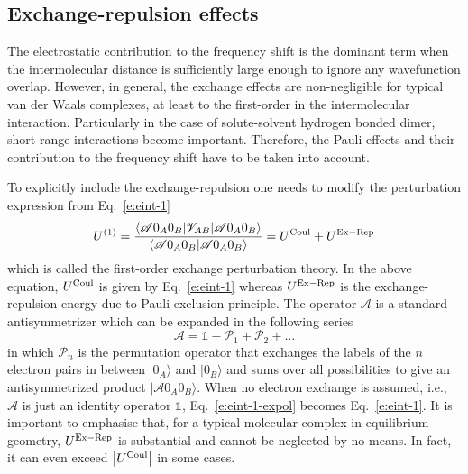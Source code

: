 \documentclass[a4paper,titlepage,twoside,fleqn,12pt]{book}
\begin{document}
\begin{refsection}
\subsection{Exchange-repulsion effects\label{s:dw-exrep}}

The electrostatic contribution to the frequency shift is the dominant term 
when the intermolecular distance is sufficiently large enough to ignore 
any wavefunction overlap. However, in general, the exchange effects
are non\hyp{}negligible for typical van der Waals complexes, at least to the first\hyp{}order
in the intermolecular interaction. Particularly 
in the case of solute\hyp{}solvent hydrogen bonded dimer, 
short\hyp{}range interactions become important. 
Therefore, the Pauli effects and their contribution to the frequency shift have to be taken into account.

To explicitly include the exchange\hyp{}repulsion one needs to
modify the perturbation expression from Eq.~\eqref{e:eint-1}
%
\begin{equation} \label{e:eint-1-expol}
U^{(1)} = 
\frac{
\langle \mathscr{A} 0_A0_B \lvert \mathscr{V}_{AB} \rvert \mathscr{A} 0_A0_B \rangle 
}{
\langle \mathscr{A} 0_A0_B \vert \mathscr{A} 0_A0_B \rangle 
}
= U^{\rm Coul} + U^{\rm Ex-Rep}
\end{equation}
%
which is called the first\hyp{}order exchange perturbation theory.
In the above equation, $U^{\rm Coul}$ is given by Eq.~\eqref{e:eint-1}
whereas $U^{\rm Ex-Rep}$ is the exchange\hyp{}repulsion
energy due to Pauli exclusion principle.
The operator $\mathscr{A}$ is a standard antisymmetrizer which
can be expanded in the following series
%
\begin{equation} \label{e:antisymmetrizer-series}
 \mathscr{A} = \mathbb{1} - \mathscr{P}_1 + \mathscr{P}_2 + \ldots
\end{equation}
%
in which $\mathscr{P}_n$ is the permutation operator that exchanges the labels 
of the $n$ electron pairs in between $\vert 0_A \rangle$ and $\vert 0_B \rangle$
and sums over all possibilities to give an antisymmetrized product
$\vert \mathscr{A} 0_A0_B \rangle $. When no electron exchange is
assumed, i.e., $\mathscr{A}$ is just an identity operator $\mathbb{1}$, 
Eq.~\eqref{e:eint-1-expol} becomes Eq.~\eqref{e:eint-1}. It is important to emphasise that, for 
a typical molecular complex in equilibrium geometry, $U^{\rm Ex-Rep}$
is substantial and cannot be neglected by no means. In fact, it can even 
exceed $\left|U^{\rm Coul}\right|$ in some cases.


\end{refsection}
\end{document}
